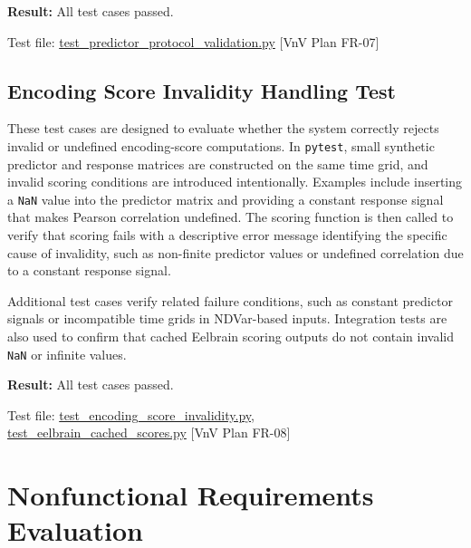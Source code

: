 \documentclass[12pt, titlepage]{article}
\begin{document}
\textbf{Result:} All test cases passed.

Test file: \href{https://github.com/Krozix-2026/cas741-speech-trf/blob/main/src/test/test_predictor_protocol_validation.py}{test\_predictor\_protocol\_validation.py} [VnV Plan FR-07]







\subsection{Encoding Score Invalidity Handling Test}

These test cases are designed to evaluate whether the system correctly rejects invalid or undefined encoding-score computations.
In \texttt{pytest}, small synthetic predictor and response matrices are constructed on the same time grid, and invalid scoring conditions are introduced intentionally.
Examples include inserting a \texttt{NaN} value into the predictor matrix and providing a constant response signal that makes Pearson correlation undefined.
The scoring function is then called to verify that scoring fails with a descriptive error message identifying the specific cause of invalidity, such as non-finite predictor values or undefined correlation due to a constant response signal.

Additional test cases verify related failure conditions, such as constant predictor signals or incompatible time grids in NDVar-based inputs.
Integration tests are also used to confirm that cached Eelbrain scoring outputs do not contain invalid \texttt{NaN} or infinite values.

\textbf{Result:} All test cases passed.

Test file: \href{https://github.com/Krozix-2026/cas741-speech-trf/blob/main/src/test/test_encoding_score_invalidity.py}{test\_encoding\_score\_invalidity.py}, \\  \href{https://github.com/Krozix-2026/cas741-speech-trf/blob/main/src/test/test_eelbrain_cached_scores.py}{test\_eelbrain\_cached\_scores.py} [VnV Plan FR-08]













\section{Nonfunctional Requirements Evaluation}
\end{document}
